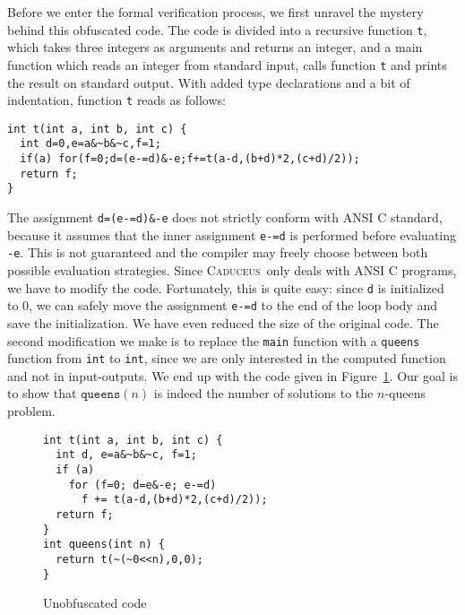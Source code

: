 \documentclass[a4paper]{llncs}
\newcommand{\caduceus}{\textsc{Caduceus}}
\begin{document}
Before we enter the formal verification process, we first unravel the
mystery behind this obfuscated code. The code is divided into
a recursive function \texttt{t}, which takes three integers as
arguments and returns an integer, and a main function which reads an
integer from standard input, calls function
\texttt{t} and prints the result on standard output.
With added type declarations and a bit of indentation, function
\texttt{t} reads as follows:
\begin{verbatim}
int t(int a, int b, int c) {
  int d=0,e=a&~b&~c,f=1;
  if(a) for(f=0;d=(e-=d)&-e;f+=t(a-d,(b+d)*2,(c+d)/2));
  return f;
}
\end{verbatim}
The assignment \verb!d=(e-=d)&-e! does not strictly conform with
ANSI C standard, because it assumes that the inner assignment \verb!e-=d! is
performed before evaluating \verb!-e!. This is not guaranteed
and the compiler may freely choose between both possible evaluation
strategies. Since \caduceus\ only deals with ANSI C programs,
we have to modify the code. Fortunately, this is quite easy:
since \verb!d! is initialized to 0, we can safely move the
assignment \verb!e-=d! to the end of the loop body and save the
initialization. We have even reduced the size of the original code.
The second modification we make is to replace the \texttt{main}
function with a \texttt{queens} function from \texttt{int} to
\texttt{int}, since we are only interested in the computed function
and not in input-outputs.
We end up with the code given in Figure~\ref{fig:code}. Our goal is
to show that $\mathtt{queens}(n)$ is indeed the number of
solutions to the $n$-queens problem.
\begin{figure}[t]
  \centering\hrulefill\vspace{-1em}
\begin{verbatim}
int t(int a, int b, int c) {
  int d, e=a&~b&~c, f=1;
  if (a)
    for (f=0; d=e&-e; e-=d)
      f += t(a-d,(b+d)*2,(c+d)/2));
  return f;
}
int queens(int n) {
  return t(~(~0<<n),0,0);
}
\end{verbatim}  
\vspace{-1.2em}\hrulefill\vspace{-1em}
  \caption{Unobfuscated code}
  \label{fig:code}
\end{figure}
\end{document}
